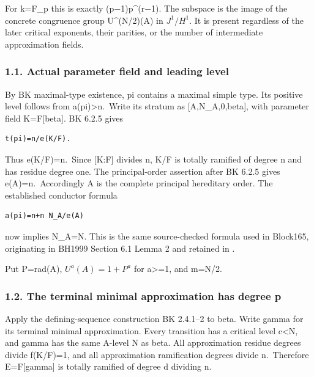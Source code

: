 For k=F\_p this is exactly (p−1)p\^{}(r−1). The subspace is the image of
the concrete congruence group U\^{}(N/2)(A) in \(J^1/H^1\).
It is present regardless of the later critical exponents, their
parities, or the number of intermediate approximation fields.

\hypertarget{odd_capacity-actual-parameter-field-and-leading-level}{%
\subsubsection{1.1. Actual parameter field and leading
level}\label{odd_capacity-actual-parameter-field-and-leading-level}}

By BK maximal-type existence, pi contains a maximal simple type. Its
positive level follows from a(pi)\textgreater n.~Write its stratum as
{[}A,N\_A,0,beta{]}, with parameter field K=F{[}beta{]}. BK 6.2.5 gives

\begin{Verbatim}[fontsize=\small,breaklines=true,breakanywhere=true]
t(pi)=n/e(K/F).
\end{Verbatim}

Thus e(K/F)=n.~Since {[}K:F{]} divides n, K/F is totally ramified of
degree n and has residue degree one. The principal-order assertion after
BK 6.2.5 gives e(A)=n.~Accordingly A is the complete principal
hereditary order. The established conductor formula

\begin{Verbatim}[fontsize=\small,breaklines=true,breakanywhere=true]
a(pi)=n+n N_A/e(A)
\end{Verbatim}

now implies N\_A=N. This is the same source-checked formula used in
Block165, originating in BH1999 Section 6.1 Lemma 2 and retained in
.

Put P=rad(A), \(U^a(A)=1+P^a\) for a\textgreater=1, and
m=N/2.

\hypertarget{odd_capacity-the-terminal-minimal-approximation-has-degree-p}{%
\subsubsection{1.2. The terminal minimal approximation has degree
p}\label{odd_capacity-the-terminal-minimal-approximation-has-degree-p}}

Apply the defining-sequence construction BK 2.4.1--2 to beta. Write
gamma for its terminal minimal approximation. Every transition has a
critical level c\textless N, and gamma has the same A-level N as beta.
All approximation residue degrees divide f(K/F)=1, and all approximation
ramification degrees divide n.~Therefore E=F{[}gamma{]} is totally
ramified of degree d dividing n.

